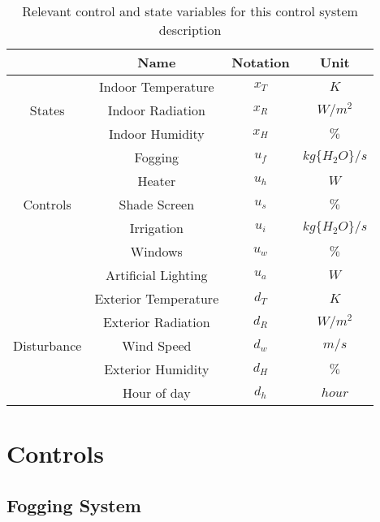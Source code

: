 \documentclass{article}
\begin{document}
\begin{table}[ht!]
    \centering
    \begin{tabular}{|c|c|c|c|}
        \hline
        &   \textbf{Name} & \textbf{Notation}       & \textbf{Unit}           \\ \hline
        \multirow{3}{*}{States} & Indoor Temperature & $x_T$    & $K$          \\ 
                                &  Indoor Radiation  & $x_R$    & $W/m^2$        \\ 
                                &  Indoor Humidity   & $x_H$    & $\%$         \\ 
                                \hline
        \multirow{5}{*}{Controls} &  Fogging     & $u_{f}$  & $kg\{H_2O\}/s$  \\ 
                                  &  Heater      & $u_{h}$    & $W$             \\ 
                                  & Shade Screen & $u_{s}$  & $\%$            \\
                                  & Irrigation   & $u_{i}$  & $kg\{H_2O\}/s$            \\
                                  & Windows   & $u_{w}$  & $\%$            \\
                                  & Artificial Lighting   & $u_{a}$  & $W$            \\
        \hline
        \multirow{5}{*}{Disturbance} &  Exterior Temperature     & $d_T$  & $K$  \\ 
                                     &  Exterior Radiation     & $d_R$  & $W/m^2$  \\ 
                                     &  Wind Speed     & $d_w$  & $m/s$  \\
                                     &  Exterior Humidity     & $d_H$  & $\%$  \\
                                     &  Hour of day & $d_h$ & $hour$ \\
        \hline
    \end{tabular}
    \caption{Relevant control and state variables for this control system description}
\end{table}
 

\section{Controls}

  
\subsection{Fogging System}
\end{document}
